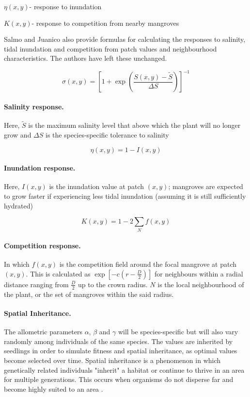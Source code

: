 \(\eta(x,y)\)- response to inundation

\(K(x,y)\)- response to competition from nearby mangroves

Salmo and Juanico also provide formulas for calculating the responses to
salinity, tidal inundation and competition from patch values and
neighbourhood characteristics. The authors have left these unchanged.

\begin{dmath}
\sigma(x,y) = \left[ 1 + \exp{\left( \frac{S(x,y) - \tilde{S}}{\Delta S} \right) } \right] ^{-1}
\end{dmath}
\paragraph{Salinity response.} Here, $\tilde{S}$ is the maximum salinity level that above which the plant will no longer grow and $\Delta S$ is the species-specific tolerance to salinity

\begin{dmath}
\eta(x,y) = 1 - I(x,y)
\end{dmath}
\paragraph{Inundation response.} Here, $I(x,y)$ is the inundation value at patch $(x,y)$; mangroves are expected to grow faster if experiencing less tidal inundation (assuming it is still sufficiently hydrated)

\begin{dmath}
K(x,y) = 1 - 2\sum_{N}{f(x,y)}
\end{dmath}
\paragraph{Competition response.} In which $f(x,y)$ is the competition field around the focal mangrove at patch $(x,y)$. This is calculated as $\exp{\left[ -c(r - \frac{D}{2}) \right]}$ for neighbours within a radial distance ranging from $\frac{D}{2}$ up to the crown radius. $N$ is the local neighbourhood of the plant, or the set of mangroves within the said radius.

\paragraph{Spatial Inheritance.} The allometric parameters \(\alpha\), \(\beta\) and \(\gamma\) will be species-specific but will also vary randomly among individuals of the
same species. The values are inherited by seedlings in order to 
simulate fitness and spatial inheritance, as optimal values become selected over time. Spatial inheritance is a phenomenon in which genetically related individuals "inherit" a habitat or
continue to thrive in an area for multiple generations. This occurs when
organisms do not disperse far and become highly suited to an area \cite{Schauber2007}.

